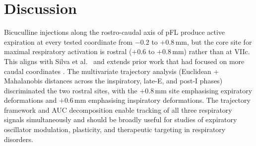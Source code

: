 \documentclass[11pt]{article}
\begin{document}
\section{Discussion}
Bicuculline injections along the rostro-caudal axis of pFL produce active expiration at every tested coordinate from $-0.2$ to $+0.8$\,mm, but the core site for maximal respiratory activation is rostral ($+0.6$ to $+0.8$\,mm) rather than at VIIc. This aligns with Silva et al.\ \citep{silva2019} and extends prior work that had focused on more caudal coordinates \citep{huckstepp2015,pisanski2019}. The multivariate trajectory analysis (Euclidean + Mahalanobis distances across the inspiratory, late-E, and post-I phases) discriminated the two rostral sites, with the $+0.8$\,mm site emphasising expiratory deformations and $+0.6$\,mm emphasising inspiratory deformations. The trajectory framework and AUC decomposition enable tracking of all three respiratory signals simultaneously and should be broadly useful for studies of expiratory oscillator modulation, plasticity, and therapeutic targeting in respiratory disorders.



\end{document}

